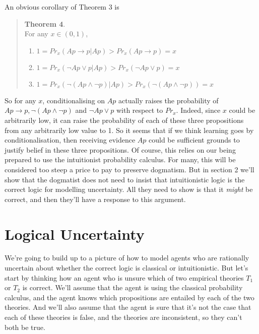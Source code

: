 \documentclass[
  11pt,
  letterpaper,
  DIV=11,
  numbers=noendperiod,
  oneside]{scrartcl}
\providecommand{\tightlist}{%
  \setlength{\itemsep}{0pt}\setlength{\parskip}{0pt}}\usepackage{longtable,booktabs,array}
\begin{document}
An obvious corollary of Theorem 3 is

\begin{quote}
\textbf{Theorem 4}.\\
For any \(x \in (0, 1)\),

\begin{enumerate}
\def\labelenumi{\arabic{enumi}.}
\tightlist
\item
  \(1 = Pr_x(Ap \rightarrow p | Ap) > Pr_x(Ap \rightarrow p) = x\)
\item
  \(1 = Pr_x(\neg Ap \vee p | Ap) > Pr_x(\neg Ap \vee p) = x\)
\item
  \(1 = Pr_x(\neg(Ap \wedge \neg p) | Ap) > Pr_x(\neg(Ap \wedge \neg p)) = x\)
\end{enumerate}
\end{quote}

So for any \(x\), conditionalising on \(Ap\) actually raises the
probability of \(Ap \rightarrow p, \neg(Ap \wedge \neg p)\) and
\(\neg Ap \vee p\) with respect to \(Pr_x\). Indeed, since \(x\) could
be arbitrarily low, it can raise the probability of each of these three
propositions from any arbitrarily low value to 1. So it seems that if we
think learning goes by conditionalisation, then receiving evidence
\(Ap\) could be sufficient grounds to justify belief in these three
propositions. Of course, this relies on our being prepared to use the
intuitionist probability calculus. For many, this will be considered too
steep a price to pay to preserve dogmatism. But in section 2 we'll show
that the dogmatist does not need to insist that intuitionistic logic is
the correct logic for modelling uncertainty. All they need to show is
that it \emph{might} be correct, and then they'll have a response to
this argument.

\section{Logical Uncertainty}\label{logical-uncertainty}

We're going to build up to a picture of how to model agents who are
rationally uncertain about whether the correct logic is classical or
intuitionistic. But let's start by thinking how an agent who is unsure
which of two empirical theories \(T_1\) or \(T_2\) is correct. We'll
assume that the agent is using the classical probability calculus, and
the agent knows which propositions are entailed by each of the two
theories. And we'll also assume that the agent is sure that it's not the
case that each of these theories is false, and the theories are
inconsistent, so they can't both be true.
\end{document}
